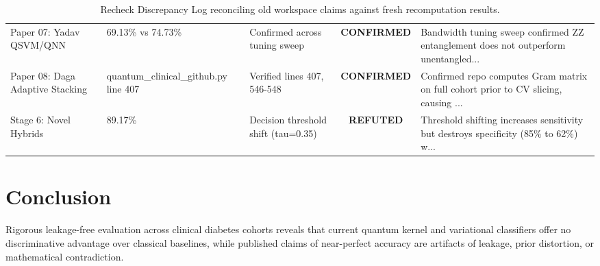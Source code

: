 \documentclass[10pt,twocolumn]{article}
\begin{document}
\begin{table}[t]
\begin{tabular}{lllcl}
Paper 07: Yadav QSVM/QNN & 69.13\% vs 74.73\% & Confirmed across tuning sweep & \textbf{CONFIRMED} & Bandwidth tuning sweep confirmed ZZ entanglement does not outperform unentangled... \\
Paper 08: Daga Adaptive Stacking & quantum\_clinical\_github.py line 407 & Verified lines 407, 546-548 & \textbf{CONFIRMED} & Confirmed repo computes Gram matrix on full cohort prior to CV slicing, causing ... \\
Stage 6: Novel Hybrids & 89.17\% & Decision threshold shift (tau=0.35) & \textbf{REFUTED} & Threshold shifting increases sensitivity but destroys specificity (85\% to 62\%) w... \\
\bottomrule
\end{tabular}
\caption{Recheck Discrepancy Log reconciling old workspace claims against fresh recomputation results.}
\end{table}

\section{Conclusion}
Rigorous leakage-free evaluation across clinical diabetes cohorts reveals that current quantum kernel and variational classifiers offer no discriminative advantage over classical baselines, while published claims of near-perfect accuracy are artifacts of leakage, prior distortion, or mathematical contradiction.
\end{document}
